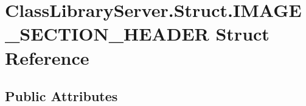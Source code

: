 \hypertarget{struct_class_library_server_1_1_struct_1_1_i_m_a_g_e___s_e_c_t_i_o_n___h_e_a_d_e_r}{}\section{Class\+Library\+Server.\+Struct.\+I\+M\+A\+G\+E\+\_\+\+S\+E\+C\+T\+I\+O\+N\+\_\+\+H\+E\+A\+D\+ER Struct Reference}
\label{struct_class_library_server_1_1_struct_1_1_i_m_a_g_e___s_e_c_t_i_o_n___h_e_a_d_e_r}
\subsection*{Public Attributes}
